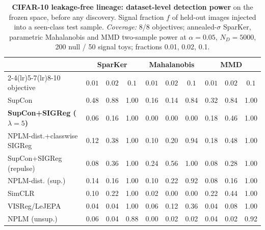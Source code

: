 \begin{table}[t]
\centering
\small
\begin{tabular}{lccccccccc}
\toprule
& \multicolumn{3}{c}{SparKer} & \multicolumn{3}{c}{Mahalanobis} & \multicolumn{3}{c}{MMD} \\
\cmidrule(lr){2-4}\cmidrule(lr){5-7}\cmidrule(lr){8-10}
objective & $0.01$ & $0.02$ & $0.1$ & $0.01$ & $0.02$ & $0.1$ & $0.01$ & $0.02$ & $0.1$ \\
\midrule
SupCon & 0.48 & 0.88 & 1.00 & 0.16 & 0.14 & 0.84 & 0.32 & 0.84 & 1.00 \\
\textbf{SupCon+SIGReg ($\lambda{=}5$)} & 0.06 & 0.16 & 1.00 & 0.00 & 0.00 & 0.00 & 0.18 & 0.46 & 1.00 \\
NPLM-dist.+classwise SIGReg & 0.12 & 0.38 & 1.00 & 0.10 & 0.20 & 0.94 & 0.18 & 0.48 & 1.00 \\
SupCon+SIGReg (repulse) & 0.08 & 0.36 & 1.00 & 0.24 & 0.56 & 1.00 & 0.08 & 0.28 & 1.00 \\
NPLM-dist. (sup.) & 0.14 & 0.16 & 1.00 & 0.10 & 0.22 & 0.92 & 0.08 & 0.16 & 1.00 \\
SimCLR & 0.10 & 0.22 & 1.00 & 0.02 & 0.00 & 0.00 & 0.22 & 0.44 & 1.00 \\
VISReg/LeJEPA & 0.04 & 0.04 & 1.00 & 0.06 & 0.12 & 0.36 & 0.04 & 0.08 & 1.00 \\
NPLM (unsup.) & 0.06 & 0.04 & 0.88 & 0.00 & 0.02 & 0.02 & 0.04 & 0.02 & 0.92 \\
\bottomrule
\end{tabular}
\caption{\textbf{CIFAR-10 leakage-free lineage: dataset-level detection power} on the frozen space, before any discovery. Signal fraction $f$ of held-out images injected into a seen-class test sample. \emph{Coverage:} 8/8 objectives; annealed-$\sigma$ SparKer, parametric Mahalanobis and MMD two-sample power at $\alpha{=}0.05$, $N_D{=}5000$, 200 null / 50 signal toys; fractions 0.01, 0.02, 0.1.}
\label{tab:app_cifar10_power}
\end{table}
